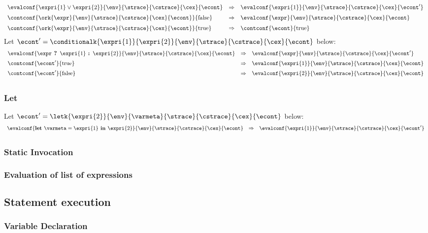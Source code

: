 \documentclass{article}
\begin{document}
\[
  \begin{array}{lcl}
	\evalconf{\expri{1} \lor \expri{2}}{\env}{\strace}{\cstrace}{\cex}{\econt}
	& \Rightarrow &
	\evalconf{\expri{1}}{\env}{\strace}{\cstrace}{\cex}{\econt'}\\[2mm]

	\contconf{\ork{\expr}{\env}{\strace}{\cstrace}{\cex}{\econt}}{\false}
	& \Rightarrow &
	\evalconf{\expr}{\env}{\strace}{\cstrace}{\cex}{\econt}\\[2mm]

	\contconf{\ork{\expr}{\env}{\strace}{\cstrace}{\cex}{\econt}}{\true}
	& \Rightarrow &
	\contconf{\econt}{\true}\\
  \end{array}
\]
\noindent
Let $\econt' = \conditionalk{\expri{1}}{\expri{2}}{\env}{\strace}{\cstrace}{\cex}{\econt}$ below:
\[
  \begin{array}{lcl}
	\evalconf{\expr \textbf{ ? } \expri{1} \textbf{ : } \expri{2}}{\env}{\strace}{\cstrace}{\cex}{\econt}
	& \Rightarrow &
	\evalconf{\expr}{\env}{\strace}{\cstrace}{\cex}{\econt'}\\[2mm]

	\contconf{\econt'}{\true}
	& \Rightarrow &
	\evalconf{\expri{1}}{\env}{\strace}{\cstrace}{\cex}{\econt}\\[2mm]

	\contconf{\econt'}{\false}
	& \Rightarrow &
	\evalconf{\expri{2}}{\env}{\strace}{\cstrace}{\cex}{\econt}\\[2mm]
  \end{array}
\]

\subsubsection{Let}
Let $\econt' = \letk{\expri{2}}{\env}{\varmeta}{\strace}{\cstrace}{\cex}{\econt}$ below:
\[
  \begin{array}{lcl}
	\evalconf{\textbf{let } \varmeta = \expri{1} \textbf{ in } \expri{2}}{\env}{\strace}{\cstrace}{\cex}{\econt}
	& \Rightarrow &
	\evalconf{\expri{1}}{\env}{\strace}{\cstrace}{\cex}{\econt'}\\[2mm]
	

  \end{array}
\]
\subsubsection{Static Invocation}
\subsubsection{Evaluation of list of expressions}
\subsection{Statement execution}
\label{subsec:stmt-exectution}
\subsubsection{Variable Declaration}
\end{document}
